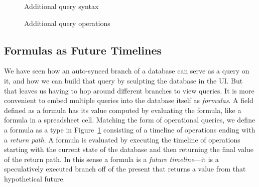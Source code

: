 \documentclass[english,submission]{programming}
\theoremstyle{definition}
\begin{document}
\begin{figure}
  \caption{Additional query syntax}
  \label{fig:query-syntax}
\end{figure}
\begin{figure}
  \caption{Additional query operations}
  \label{fig:query-operations}
\end{figure}


\subsection{Formulas as Future Timelines}\label{formulas}

We have seen how an auto-synced branch of a database can serve as a query on it, and how we can build that query by sculpting the database in the UI. But that leaves us having to hop around different branches to view queries. It is more convenient to embed multiple queries into the database itself as \textit{formulas}. A field defined as a formula has its value computed by evaluating the formula, like a formula in a spreadsheet cell. Matching the form of operational queries, we define a formula as a type in Figure~\ref{fig:query-syntax} consisting of a timeline of operations ending with a \textit{return path}. A formula is evaluated by executing the timeline of operations starting with the current state of the database and then returning the final value of the return path. In this sense a formula is a \textit{future timeline}---it is a speculatively executed branch off of the present that returns a value from that hypothetical future.
\end{document}
